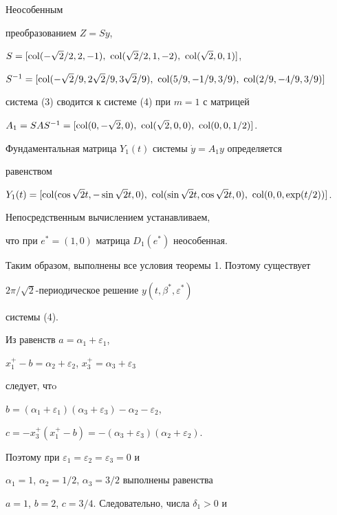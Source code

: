 Неособенным 


преобразованием $Z=Sy$, 


$S=[\col(-\sqrt{2}/2,2,-1),\ \col(\sqrt{2}/2,1,-2), 


\ \col(\sqrt{2},0,1)]$,


$S^{-1}=[\col(-\sqrt{2}/9,2\sqrt{2}/9,3\sqrt{2}/9),\ 


\col(5/9,-1/9,3/9),\ \col(2/9,-4/9,3/9)]$ 


система (3) сводится к системе (4) при $m=1$ с матрицей 


$A_1=SAS^{-1}=[\col(0,-\sqrt{2},0),\ \col(\sqrt{2},0,0), 


\ \col(0,0,1/2)]$. 


Фундаментальная матрица $Y_1(t)$ системы $\Dot y=A_1y$ определяется 


равенством 


$Y_1(t)=[\col(\cos\sqrt{2}t,\linebreak -\sin\sqrt{2}t,0),\ 


\col(\sin\sqrt{2}t,\cos\sqrt{2}t,0),\ \col(0,0,\exp(t/2))]$. 


Непосредственным вычислением устанавливаем, 


что при $e^*=(1,0)$ матрица $D_1(e^*)$ неособенная. 


 


Таким образом, выполнены все условия теоремы 1. Поэтому существует 


$2\pi/\sqrt{2}$-периодическое решение $y(t,\beta^*,\varepsilon^*)$ 


системы (4). 


 


Из равенств $a=\alpha_1+\varepsilon_1$, 


$x^+_1-b=\alpha_2+\varepsilon_2$, $x^+_3=\alpha_3+\varepsilon_3$ 


следует, чтo 


$b=(\alpha_1+\varepsilon_1)(\alpha_3+\varepsilon_3)- 


\alpha_2-\varepsilon_2$, 


$c=-x^+_3(x^+_1-b)=-(\alpha_3+\varepsilon_3) 


(\alpha_2+\varepsilon_2)$. 


Поэтому при $\varepsilon_1=\varepsilon_2=\varepsilon_3=0$ и 


$\alpha_1=1$, $\alpha_2=1/2$, $\alpha_3=3/2$ выполнены равенства 


$a=1$, $b=2$, $c=3/4$. Следовательно, числа $\delta_1>0$ и 



